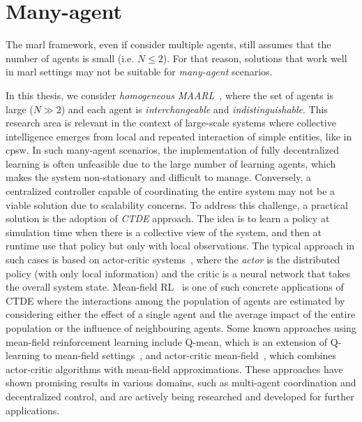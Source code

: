 \section{Many-agent}
The \ac{marl} framework, even if consider multiple agents,
  still assumes that the number of agents is small (i.e. $N \leq 2$).
  For that reason, solutions that work well in \ac{marl} settings may not be suitable for \emph{many-agent} scenarios.

In this thesis, we consider \emph{homogeneous \ac{MAARL}}~\cite{yang2021many}, 
 where the set of agents is large ($N \gg 2$) and each agent is \emph{interchangeable} and \emph{indistinguishable}.
%
This research area is relevant in the context of large-scale systems 
 where collective intelligence emerges from local and repeated interaction of simple entities, like in \ac{cpsw}.
%
In such many-agent scenarios, 
 the implementation of fully decentralized learning is often unfeasible due to the large number of learning agents, 
 which makes the system non-stationary and difficult to manage. 
%
Conversely, a centralized controller capable of coordinating 
 the entire system may not be a viable solution due to scalability concerns. 
 To address this challenge, a practical solution is the adoption of \emph{\ac{CTDE}} approach.
%
The idea is to learn a policy at simulation time when there is a collective view of the system, 
 and then at runtime use that policy but only with local observations. 
%
The typical approach in such cases is based on actor-critic systems~\cite{DBLP:conf/nips/LoweWTHAM17,wu2022more,song2022ctds,song2022centralized},
  where the \emph{actor} is the distributed policy (with only local information) and the critic is a neural network that takes the overall system state.
%
Mean-field RL~\cite{pmlr-v80-yang18d} is one of such concrete applications of \ac{CTDE} 
 where the interactions among the population of agents are estimated by considering either the effect of a single agent and the average impact of the entire population or the influence of neighbouring agents.
%
Some known approaches using mean-field reinforcement learning include Q-mean, 
 which is an extension of Q-learning to mean-field settings~\cite{yang2018mean}, 
 and actor-critic mean-field~\cite{frikha2023actor}, which combines actor-critic algorithms with mean-field approximations. 
%
These approaches have shown promising results in various domains, such as multi-agent coordination 
 and decentralized control, and are actively being researched and developed for further applications.

